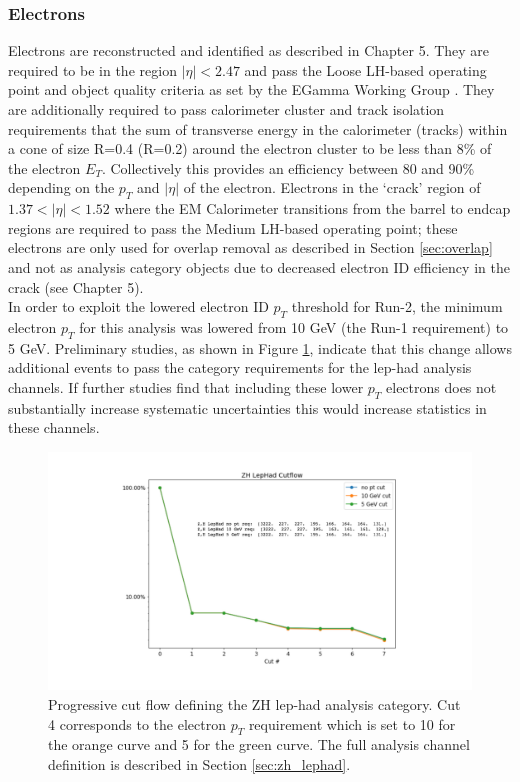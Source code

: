 \subsubsection{Electrons}
Electrons are reconstructed and identified as described in Chapter 5. They are required to be in the region $|\eta|<2.47$ and pass the Loose LH-based operating point and object quality criteria as set by the EGamma Working Group \cite{egam_cp}. They are additionally required to pass calorimeter cluster and track isolation requirements that the sum of transverse energy in the calorimeter (tracks) within a cone of size R=0.4 (R=0.2) around the electron cluster to be less than 8\% of the electron $E_T$. Collectively this provides an efficiency between 80 and 90\% depending on the $p_T$ and $|\eta|$ of the electron. Electrons in the  `crack' region of $1.37<|\eta|<1.52$ where the EM Calorimeter transitions from the barrel to endcap regions are required to pass the Medium LH-based operating point; these electrons are only used for overlap removal as described in Section \ref{sec:overlap} and not as analysis category objects due to decreased electron ID efficiency in the crack (see Chapter 5).\\

In order to exploit the lowered electron ID $p_T$ threshold for Run-2, the minimum electron $p_T$ for this analysis was lowered from 10 GeV (the Run-1 requirement) to 5 GeV. Preliminary studies, as shown in Figure \ref{fig:lowpt_cuflow}, indicate that this change allows additional events to pass the category requirements for the lep-had analysis channels. If further studies find that including these lower $p_T$ electrons does not substantially increase systematic uncertainties this would increase statistics in these channels.

\begin{figure}[htb!]
    \centering
    \includegraphics[width=4.5in]{figures/chapter6/lowpt_cutflow.pdf}
    \caption{Progressive cut flow defining the ZH lep-had analysis category. Cut 4 corresponds to the electron $p_T$ requirement which is set to 10 for the orange curve and 5 for the green curve. The full analysis channel definition is described in Section \ref{sec:zh_lephad}.}
    \label{fig:lowpt_cuflow}
\end{figure}

